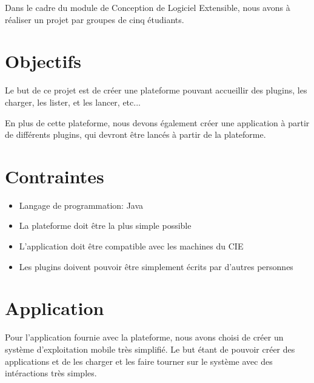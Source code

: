 Dans le cadre du module de Conception de Logiciel Extensible, nous avons à réaliser un projet par groupes de cinq étudiants.

\section{Objectifs}

Le but de ce projet est de créer une plateforme pouvant accueillir des plugins, les charger, les lister, et les lancer, etc...

En plus de cette plateforme, nous devons également créer une application à partir de différents plugins, qui devront être lancés à partir de la plateforme.

\section{Contraintes}

\begin{itemize}

\item Langage de programmation: Java
\item La plateforme doit être la plus simple possible
\item L'application doit être compatible avec les machines du CIE
\item Les plugins doivent pouvoir être simplement écrits par d'autres personnes

\end{itemize}

\section{Application}

Pour l'application fournie avec la plateforme, nous avons choisi de créer un système d'exploitation mobile très simplifié. Le but étant de pouvoir créer des applications et de les charger et les faire tourner sur le système avec des intéractions très simples.
